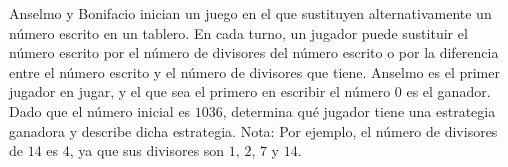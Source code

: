 Anselmo y Bonifacio inician un juego en el que sustituyen alternativamente un número escrito en un tablero. En cada turno, un jugador puede sustituir el número escrito por el número de divisores del número escrito o por la diferencia entre el número escrito y el número de divisores que tiene. Anselmo es el primer jugador en jugar, y el que sea el primero en escribir el número $0$ es el ganador. Dado que el número inicial es $1036$, determina qué jugador tiene una estrategia ganadora y describe dicha estrategia.
Nota: Por ejemplo, el número de divisores de $14$ es $4$, ya que sus divisores son $1$, $2$, $7$ y $14$.
